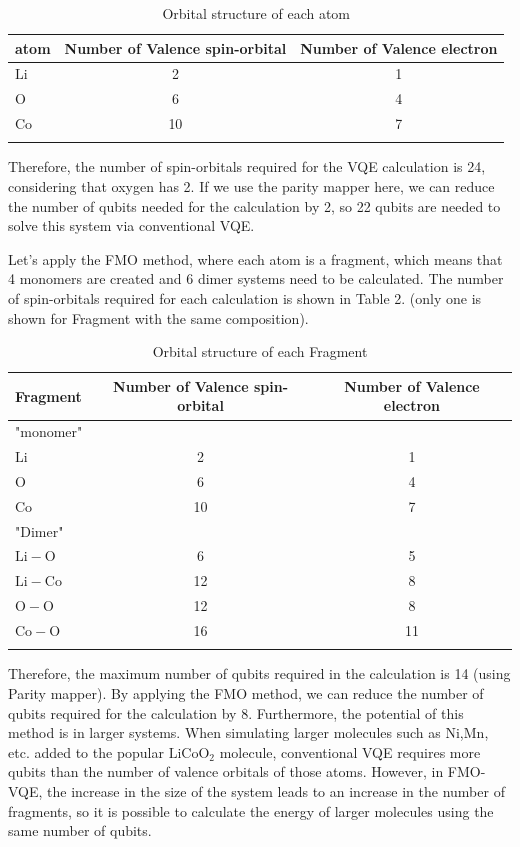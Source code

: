\documentclass[pdflatex,sn-mathphys-num]{sn-jnl}%
\theoremstyle{thmstyleone}%
\theoremstyle{thmstyletwo}%
\theoremstyle{thmstylethree}%
\begin{document}
\begin{table}[h]
\caption{Orbital structure of each atom}\label{tab1}%
\begin{tabular}{@{}lcc@{}}
\toprule
atom & Number of Valence spin-orbital  & Number of Valence electron\\
\midrule
\(\mathrm{Li}\)   & 2   & 1   \\ 
\(\mathrm{O}\)   & 6   & 4  \\
\(\mathrm{Co}\)   & 10   & 7   \\
\botrule
\end{tabular}
\end{table}
Therefore, the number of spin-orbitals required for the VQE calculation is 24, considering that oxygen has 2. 
If we use the parity mapper here, we can reduce the number of qubits needed for the calculation by 2,
so 22 qubits are needed to solve this system via conventional VQE. 

Let's apply the FMO method, where each atom is a fragment, which means that 4 monomers are created and 6 dimer systems need to be calculated. 
The number of spin-orbitals required for each calculation is shown in Table 2. (only one is shown for Fragment with the same composition).
\begin{table}[h]
\caption{Orbital structure of each Fragment}\label{tab2}%
\begin{tabular}{@{}lcc@{}}
\toprule
Fragment & Number of Valence spin-orbital  & Number of Valence electron\\
\midrule
"monomer"   &   &  \\
\(\mathrm{Li}\)   & 2   & 1   \\
\(\mathrm{O}\)   & 6   & 4  \\
\(\mathrm{Co}\)   & 10   & 7   \\
"Dimer"   &   &  \\
\(\mathrm{Li-O}\)   & 6   & 5   \\
\(\mathrm{Li-Co}\)   & 12   & 8  \\
\(\mathrm{O-O}\)   & 12   & 8   \\
\(\mathrm{Co-O}\)   & 16   & 11   \\
\botrule
\end{tabular}
\end{table}

Therefore, the maximum number of qubits required in the calculation is 14 (using Parity mapper). 
By applying the FMO method, we can reduce the number of qubits required for the calculation by 8. 
Furthermore, the potential of this method is in larger systems. 
When simulating larger molecules such as \(\mathrm{Ni}\),\(\mathrm{Mn}\), etc. 
added to the popular \(\mathrm{LiCoO_2}\) molecule, conventional VQE requires more qubits than the number of valence orbitals of those atoms.
However, in FMO-VQE, the increase in the size of the system leads to an increase in the number of fragments, 
so it is possible to calculate the energy of larger molecules using the same number of qubits.
\end{document}
